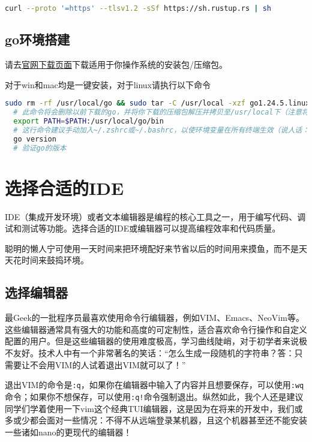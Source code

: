 \begin{lstlisting}[language=bash]
  curl --proto '=https' --tlsv1.2 -sSf https://sh.rustup.rs | sh
\end{lstlisting}

\subsection{go环境搭建}

请去\href{https://go.dev/doc/install}{官网下载页面}下载适用于你操作系统的安装包/压缩包。

对于win和mac均是一键安装，对于linux请执行以下命令

\begin{lstlisting}[language=bash]
  sudo rm -rf /usr/local/go && sudo tar -C /usr/local -xzf go1.24.5.linux-amd64.tar.gz
  # 此命令将会删除以前下载的go，并将你下载的压缩包解压并拷贝至/usr/local下（注意将其替换为压缩包的真实路径）
  export PATH=$PATH:/usr/local/go/bin
  # 这行命令建议手动加入~/.zshrc或~/.bashrc，以使环境变量在所有终端生效（说人话：让终端能找到你的go在哪）
  go version
  # 验证go的版本
\end{lstlisting}

\section{选择合适的IDE}

IDE（集成开发环境）或者文本编辑器是编程的核心工具之一，用于编写代码、调试和测试等功能。选择合适的IDE或编辑器可以提高编程效率和代码质量。

聪明的懒人宁可使用一天时间来把环境配好来节省以后的时间用来摸鱼，而不是天天花时间来鼓捣环境。

\subsection{选择编辑器}

最Geek的一批程序员最喜欢使用命令行编辑器，例如VIM、Emacs、NeoVim等。这些编辑器通常具有强大的功能和高度的可定制性，适合喜欢命令行操作和自定义配置的用户。但是这些编辑器的使用难度极高，学习曲线陡峭，对于初学者来说极不友好。技术人中有一个非常著名的笑话：“怎么生成一段随机的字符串？答：只需要让不会用VIM的人试着退出VIM就可以了！”

\begin{tip}
  退出VIM的命令是\texttt{:q}，如果你在编辑器中输入了内容并且想要保存，可以使用\texttt{:wq}命令；如果你不想保存，可以使用\texttt{:q!}命令强制退出。纵然如此，我个人还是建议同学们学着使用一下vim这个经典TUI编辑器，这是因为在将来的开发中，我们或多或少都会面对一些情况：不得不从远端登录某机器，且这个机器甚至还不能安装一些诸如nano的更现代的编辑器！
\end{tip}


